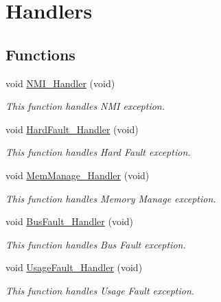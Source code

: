 \hypertarget{group___interrupt}{
\section{Handlers}
\label{group___interrupt}
}
\subsection*{Functions}
\begin{DoxyCompactItemize}
\item 
void \hyperlink{group___interrupt_ga6ad7a5e3ee69cb6db6a6b9111ba898bc}{NMI\_\-Handler} (void)
\begin{DoxyCompactList}\small\item\em This function handles NMI exception. \item\end{DoxyCompactList}\item 
void \hyperlink{group___interrupt_ga2bffc10d5bd4106753b7c30e86903bea}{HardFault\_\-Handler} (void)
\begin{DoxyCompactList}\small\item\em This function handles Hard Fault exception. \item\end{DoxyCompactList}\item 
void \hyperlink{group___interrupt_ga3150f74512510287a942624aa9b44cc5}{MemManage\_\-Handler} (void)
\begin{DoxyCompactList}\small\item\em This function handles Memory Manage exception. \item\end{DoxyCompactList}\item 
void \hyperlink{group___interrupt_ga850cefb17a977292ae5eb4cafa9976c3}{BusFault\_\-Handler} (void)
\begin{DoxyCompactList}\small\item\em This function handles Bus Fault exception. \item\end{DoxyCompactList}\item 
void \hyperlink{group___interrupt_ga1d98923de2ed6b7309b66f9ba2971647}{UsageFault\_\-Handler} (void)
\begin{DoxyCompactList}\small\item\em This function handles Usage Fault exception. \item\end{DoxyCompactList}\item 

\end{DoxyCompactItemize}
